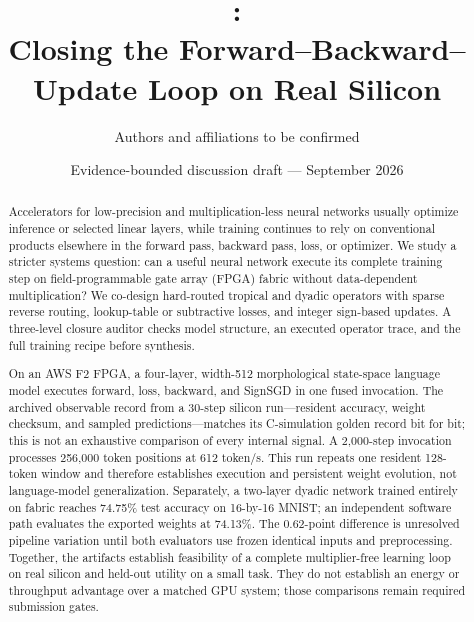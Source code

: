 \documentclass[10pt]{article}
\title{\systemname:\\
Closing the Forward--Backward--Update Loop on Real Silicon}
\author{Authors and affiliations to be confirmed}
\date{Evidence-bounded discussion draft --- September 2026}
\begin{document}
\maketitle

\begin{center}
\end{center}

\begin{abstract}
Accelerators for low-precision and multiplication-less neural networks usually
optimize inference or selected linear layers, while training continues to rely
on conventional products elsewhere in the forward pass, backward pass, loss,
or optimizer.  We study a stricter systems question: can a useful neural
network execute its complete training step on field-programmable gate array
(FPGA) fabric without data-dependent multiplication?  We co-design hard-routed
tropical and dyadic operators with sparse reverse routing, lookup-table or
subtractive losses, and integer sign-based updates.  A three-level closure
auditor checks model structure, an executed operator trace, and the full
training recipe before synthesis.

On an AWS F2 FPGA, a four-layer, width-512 morphological state-space language
model executes forward, loss, backward, and SignSGD in one fused invocation.
The archived observable record from a 30-step silicon run---resident accuracy,
weight checksum, and sampled predictions---matches its C-simulation golden
record bit for bit; this is not an exhaustive comparison of every internal
signal.  A 2,000-step invocation processes 256,000 token positions at 612
token/s.  This run repeats one resident 128-token window and therefore
establishes execution and persistent weight evolution, not language-model
generalization.  Separately, a two-layer dyadic network trained entirely on
fabric reaches 74.75\% test accuracy on 16-by-16 MNIST; an independent software
path evaluates the exported weights at 74.13\%.  The 0.62-point difference is
unresolved pipeline variation until both evaluators use frozen identical
inputs and preprocessing.  Together, the artifacts establish feasibility of a
complete multiplier-free learning loop on real silicon and held-out utility on
a small task.  They do not establish an energy or throughput advantage over a
matched GPU system; those comparisons remain required submission gates.
\end{abstract}
\end{document}
